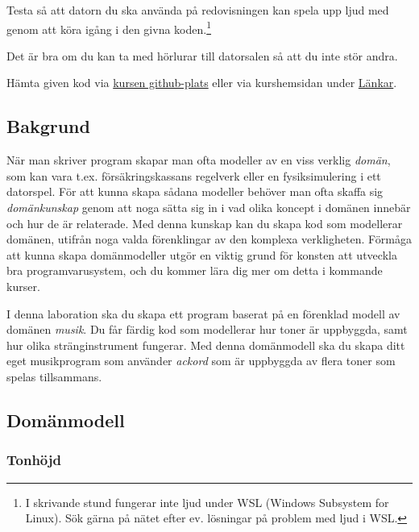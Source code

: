 


\begin{Preparations}
\item Testa så att datorn du ska använda på redovisningen kan spela upp ljud med  genom att köra igång  i den givna koden.\footnote{I skrivande stund fungerar inte ljud under WSL (Windows Subsystem for Linux). Sök gärna på nätet efter ev. lösningar på problem med ljud i WSL.}
\item Det är bra om du kan ta med hörlurar till datorsalen så att du inte stör andra.
\item Hämta given kod via \href{https://github.com/lunduniversity/introprog/tree/master/workspace/}{kursen github-plats} eller via kurshemsidan under \href{https://lunduniversity.github.io/pgk/#l%C3%A4nkar}{Länkar}.
\end{Preparations}

\subsection{Bakgrund}
När man skriver program skapar man ofta modeller av en viss verklig \emph{domän}, som kan vara t.ex. försäkringskassans regelverk eller en fysiksimulering i ett datorspel. För att kunna skapa sådana modeller behöver man ofta skaffa sig  \emph{domänkunskap} genom att noga sätta sig in i vad olika koncept i domänen innebär och hur de är relaterade. Med denna kunskap kan du skapa kod som modellerar domänen, utifrån noga valda förenklingar av den komplexa verkligheten. Förmåga att kunna skapa domänmodeller utgör en viktig grund för konsten att utveckla bra programvarusystem, och du kommer lära dig mer om detta i kommande kurser.

I denna laboration ska du skapa ett program baserat på en förenklad modell av domänen \emph{musik}. Du får färdig kod som modellerar hur toner är uppbyggda, samt hur olika stränginstrument fungerar.
Med denna domänmodell ska du skapa ditt eget musikprogram som använder \emph{ackord} som är uppbyggda av flera toner som spelas tillsammans.

\subsection{Domänmodell}


\subsubsection{Tonhöjd}

